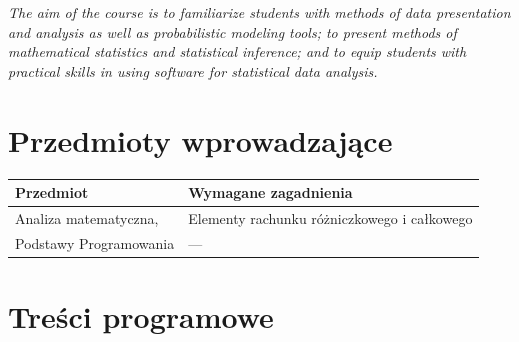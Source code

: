 \documentclass[12pt, a4paper]{article}
\newcommand{\thdrule}{\noalign{\global\setlength{\extrarowheight}{0pt}}}
\newcommand{\thdend}{\noalign{\global\setlength{\extrarowheight}{3pt}}}
\begin{document}
\textit{The aim of the course is to familiarize students with methods of data presentation and analysis as well as probabilistic modeling tools; to present methods of mathematical statistics and statistical inference; and to equip students with practical skills in using software for statistical data analysis.}


\section{Przedmioty wprowadzające}

{\scriptsize
\begin{tabularx}{\textwidth}{m{5cm}Y}
\thdrule\toprule
{} {\color{white}\textbf{Przedmiot}} & {\color{white}\textbf{Wymagane zagadnienia}} \\
\midrule\thdend
   Analiza matematyczna, & Elementy rachunku różniczkowego i całkowego \\
   Podstawy Programowania & --- \\
\bottomrule
\end{tabularx}}

\section{Treści programowe}
\end{document}
